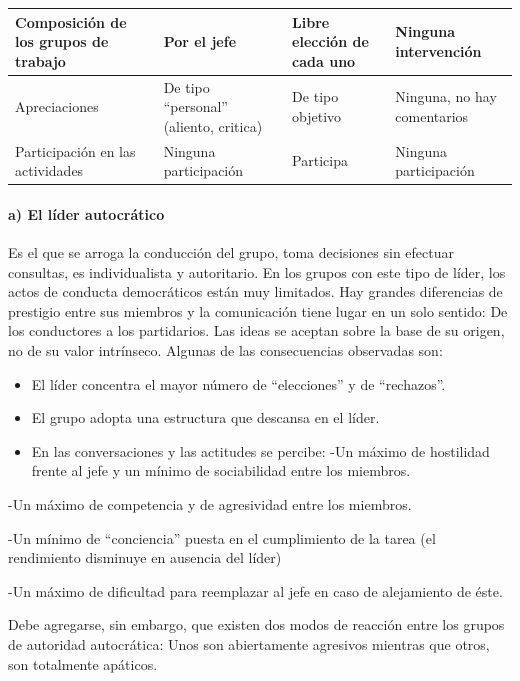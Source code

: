 
\begin{center}
\small
\begin{tabular}{|p{}|p{}|p{}|p{}|}
\hline
Composición de los grupos de trabajo & Por el jefe & Libre elección de cada uno & Ninguna intervención \\ \hline
Apreciaciones & De tipo “personal” (aliento, critica) & De tipo objetivo & Ninguna, no hay comentarios \\ \hline
Participación en las actividades & Ninguna participación & Participa & Ninguna participación \\ \hline
\end{tabular}
\end{center}

\paragraph*{a) El líder autocrático}
Es el que se arroga la conducción del grupo, toma decisiones sin efectuar consultas, es individualista y autoritario. En los grupos con este tipo de líder, los actos de conducta democráticos están muy limitados. Hay grandes diferencias de prestigio entre sus miembros y la comunicación tiene lugar en un solo sentido: De los conductores a los partidarios. Las ideas se aceptan sobre la base de su origen, no de su valor intrínseco. Algunas de las consecuencias observadas son:

\begin{itemize}
  \item El líder concentra el mayor número de “elecciones” y de “rechazos”.
  \item El grupo adopta una estructura que descansa en el líder.
  \item En las conversaciones y las actitudes se percibe: -Un máximo de hostilidad frente al jefe y un mínimo de sociabilidad entre los miembros.
\end{itemize}
-Un máximo de competencia y de agresividad entre los miembros.

-Un mínimo de “conciencia” puesta en el cumplimiento de la tarea (el rendimiento disminuye en ausencia del líder)

-Un máximo de dificultad para reemplazar al jefe en caso de alejamiento de éste.

Debe agregarse, sin embargo, que existen dos modos de reacción entre los grupos de autoridad autocrática: Unos son abiertamente agresivos mientras que otros, son totalmente apáticos.

